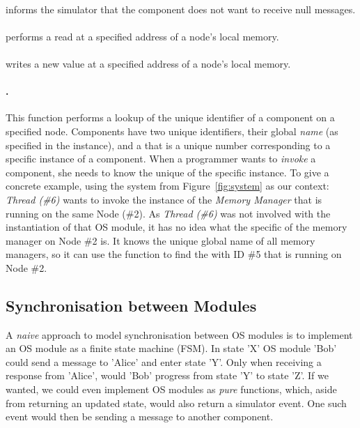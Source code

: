\paragraph{}
informs the simulator that the component does not want to receive null messages.
\paragraph{}
performs a read at a specified address of a node's local memory.
\paragraph{}
writes a new value at a specified address of a node's local memory.
\paragraph{.}
This function performs a lookup of the unique identifier of a component on a specified node.
Components have two unique identifiers, their global \emph{name} (as specified in the  instance), and a  that is a unique number corresponding to a specific instance of a component.
When a programmer wants to \emph{invoke} a component, she needs to know the unique \mbox{} of the specific instance.
To give a concrete example, using the system from Figure~\ref{fig:system} as our context: \emph{Thread (\#6)} wants to invoke the instance of the \emph{Memory Manager} that is running on the same Node (\#2).
As \emph{Thread (\#6)} was not involved with the instantiation of that OS module, it has no idea what the specific  of the memory manager on Node \#2 is.
It knows the unique global name of all memory managers, so it can use the  function to find the  with ID \#5 that is running on Node \#2.

\subsection{Synchronisation between Modules}
A \emph{naive} approach to model synchronisation between OS modules is to implement an OS module as a finite state machine (FSM).
In state 'X' OS module 'Bob' could send a message to 'Alice' and enter state 'Y'.
Only when receiving a response from 'Alice', would 'Bob' progress from state 'Y' to state 'Z'.
If we wanted, we could even implement OS modules as \emph{pure} functions, which, aside from returning an updated state, would also return a simulator event.
One such event would then be sending a message to another component.

